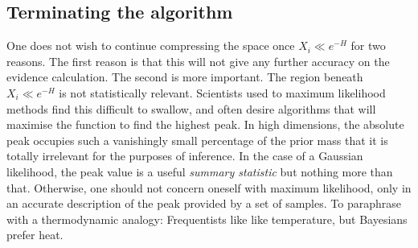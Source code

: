 \subsection{Terminating the algorithm}
One does not wish to continue compressing the space once \(X_i\ll e^{-H}\) for two reasons. The first reason is that this will not give any further accuracy on the evidence calculation. The second is more important. The region beneath \(X_i\ll e^{-H}\) is not statistically relevant. Scientists used to maximum likelihood methods find this difficult to swallow, and often desire algorithms that will maximise the function to find the highest peak. In high dimensions, the absolute peak occupies such a vanishingly small percentage of the prior mass that it is totally irrelevant for the purposes of inference. In the case of a Gaussian likelihood, the peak value is a useful {\em summary statistic\/} but nothing more than that. Otherwise, one should not concern oneself with maximum likelihood, only in an accurate description of the peak provided by a set of samples. To paraphrase with a thermodynamic analogy: Frequentists like  like temperature, but Bayesians prefer heat.

